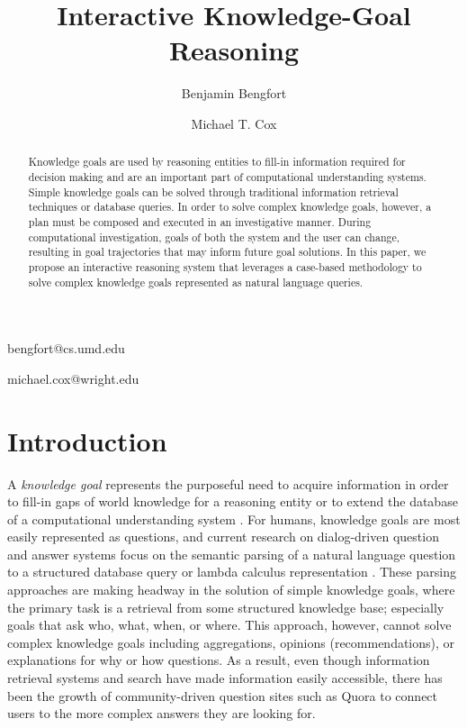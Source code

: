 \documentclass{llncs}
\begin{document}
\title{Interactive Knowledge-Goal Reasoning}

\author{Benjamin Bengfort}{bengfort@cs.umd.edu}
\address{Department of Computer Science, University of Maryland,
         College Park, MD 20742 USA}
\author{Michael T. Cox}{michael.cox@wright.edu}
\address{Wright State Research Institute, Wright State University,
         Dayton, OH 45435 USA}
\vskip 0.2in


\begin{abstract}
Knowledge goals are used by reasoning entities to fill-in information required for decision making and are an important part of computational understanding systems. Simple knowledge goals can be solved through traditional information retrieval techniques or database queries. In order to solve complex knowledge goals, however, a plan must be composed and executed in an investigative manner. During computational investigation, goals of both the system and the user can change, resulting in goal trajectories that may inform future goal solutions. In this paper, we propose an interactive reasoning system that leverages a case-based methodology to solve complex knowledge goals represented as natural language queries.
\end{abstract}

\section{Introduction}

A \textit{knowledge goal} represents the purposeful need to acquire information in order to fill-in gaps of world knowledge for a reasoning entity or to extend the database of a computational understanding system \cite{ram_goal-based_1991}. For humans, knowledge goals are most easily represented as questions, and current research on dialog-driven question and answer systems focus on the semantic parsing of a natural language question to a structured database query \cite{yahya_natural_2012} or lambda calculus representation \cite{berant_semantic_2013}. These parsing approaches are making headway in the solution of simple knowledge goals, where the primary task is a retrieval from some structured knowledge base; especially goals that ask who, what, when, or where. This approach, however, cannot solve complex knowledge goals including aggregations, opinions (recommendations), or explanations for why or how questions. As a result, even though information retrieval systems and search have made information easily accessible, there has been the growth of community-driven question sites such as Quora \cite{wang_wisdom_2013} to connect users to the more complex answers they are looking for.
\end{document}
